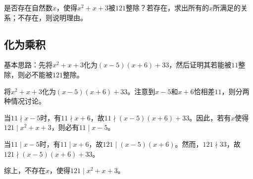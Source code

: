 

是否存在自然数$x$，使得$x^2 + x + 3$被$121$整除？若存在，求出所有的$x$所满足的关系；不存在，则说明理由。


\subsection{化为乘积}

基本思路：先将$x^2 + x + 3$化为$(x - 5)(x + 6) + 33$，然后证明其若能被$11$整除，则必不能被$121$整除。

将$x^2 + x + 3$化为$(x - 5)(x + 6) + 33$。注意到$x - 5$和$x + 6$恰相差$11$，则分两种情况讨论。

当$11 \nmid x - 5$时，有$11 \nmid x + 6$，故$11 \nmid (x - 5)(x + 6) + 33$。因此，若有$x$使得$121 \mid x^2 + x + 3$，则必有$11 \mid x - 5$。

当$11 \mid x - 5$时，有$11 \mid x + 6$，故$121 \mid (x - 5)(x + 6)$。然而，$121 \nmid 33$，故$121 \nmid (x - 5)(x + 6) + 33$。

综上，不存在$x$，使得$121 \mid x^2 + x + 3$。
